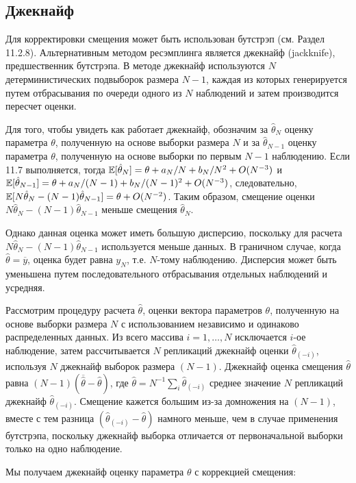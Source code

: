 \subsection{Джекнайф}

Для корректировки смещения может быть использован бутстрэп (см. Раздел 11.2.8). Альтернативным методом ресэмплинга является джекнайф (jackknife), предшественник бутстрэпа. В методе джекнайф используются $N$ детерминистических подвыборок размера $N-1$, каждая из которых генерируется путем отбрасывания по очереди одного из $N$ наблюдений и затем производится пересчет оценки.

Для того, чтобы увидеть как работает джекнайф, обозначим за $\hat{\theta}_N$ оценку параметра $\theta$, полученную на основе выборки размера $N$ и за $\hat{\theta}_{N-1}$ оценку параметра $\theta$, полученную на основе выборки по первым $N-1$ наблюдению. Если 11.7 выполняется, тогда $\mathbb{E}[\hat{\theta}_N]=\theta+a_N/N+b_N/N^2+O(N^{-3})$ и $\mathbb{E}[\hat{\theta}_{N-1}]=\theta+a_N/(N-1)+b_N/(N-1)^2+O(N^{-3})$, следовательно, $\mathbb{E}[N\hat{\theta}_N-(N-1)\hat{\theta}_{N-1}]=\theta+O(N^{-2})$. Таким образом, смещение оценки $N\hat{\theta}_N-(N-1)\hat{\theta}_{N-1}$ меньше смещения $\hat{\theta}_N$.

Однако данная оценка может иметь большую дисперсию, поскольку для расчета $N\hat{\theta}_N-(N-1)\hat{\theta}_{N-1}$ используется меньше данных. В граничном случае, когда $\hat{\theta}=\overline{y}$, оценка будет равна $y_N$, т.е. $N$-тому наблюдению. Дисперсия может быть уменьшена путем последовательного отбрасывания отдельных наблюдений и усредняя.

Рассмотрим процедуру расчета $\hat{\theta}$, оценки вектора параметров $\theta$, полученную на основе выборки размера $N$ с использованием независимо и одинаково распределенных данных. Из всего массива $i=1,\ldots ,N$ исключается $i$-ое наблюдение, затем рассчитывается $N$ репликаций джекнайф  оценки $\hat{\theta}_{(-i)}$, используя $N$ джекнайф выборок размера $(N-1)$. Джекнайф оценка смещения $\hat{\theta}$ равна $(N-1)(\overline{\hat{\theta}}-\hat{\theta})$, где $\hat{\theta}=N^{-1}\sum_{i}\hat{\theta}_{(-i)}$ среднее значение $N$ репликаций джекнайф  $\hat{\theta}_{(-i)}$. Смещение кажется большим из-за домножения на $(N-1)$, вместе с тем разница $(\hat{\theta}_{(-i)}-\hat{\theta})$ намного меньше, чем в случае применения бутстрэпа, поскольку джекнайф выборка отличается от первоначальной выборки только на одно наблюдение. 

Мы получаем джекнайф оценку параметра $\theta$ с коррекцией смещения:

